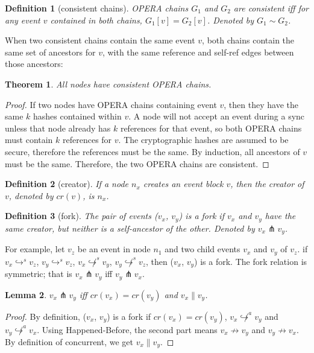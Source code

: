\documentclass{article}
\newtheorem{thm}{Theorem}[section]
\newtheorem{lem}[thm]{Lemma}
\newtheorem{defn}{Definition}[section]
\newcommand{\eself}{\hookrightarrow^{s}}
\newcommand{\eancestor}{\hookrightarrow^{a}}
\newcommand{\efork}{\pitchfork}
\newcommand{\concur}{\parallel}
\begin{document}
\begin{defn}[consistent chains]\label{dfn:conchains} OPERA chains $G_1$ and $G_2$ are consistent iff for any event $v$ contained in both chains, $G_1[v] = G_2[v]$. Denoted by $G_1 \sim G_2$.
\end{defn}
When two consistent chains contain the same event $v$, both chains contain the same set of ancestors for $v$, with the same reference and self-ref edges between those ancestors:
\begin{thm}\label{thm:conchains}
	All nodes have consistent OPERA chains.
\end{thm}
\begin{proof}
	 If two nodes have OPERA chains containing event $v$, then they have the same $k$ hashes contained within $v$. A node will not accept an event during a sync unless that node already has $k$ references for that event, so both OPERA chains must contain $k$ references for $v$. The cryptographic hashes are assumed to be secure, therefore the references must be the same. By induction, all ancestors of $v$ must be the same. Therefore, the two OPERA chains are consistent.
\end{proof}


\begin{defn}[creator] If a node $n_x$ creates an event block $v$, then the creator of $v$, denoted by $cr(v)$, is $n_x$.
\end{defn}


\begin{defn}[fork]
	The pair of events ($v_x$, $v_y$) is a fork if $v_x$ and $v_y$ have the same creator, but neither is a self-ancestor of the other. Denoted by $v_x \efork v_y$.
\end{defn}
For example, let $v_z$ be an event in node $n_1$ and two child events $v_x$ and $v_y$ of $v_z$. if $v_x \eself v_z$, $v_y \eself v_z$, $v_x \not \eself v_y$, $v_y \not \eself v_z$, then ($v_x$, $v_y$) is a fork.
The fork relation is symmetric; that is $v_x \efork v_y$ iff $v_y \efork v_x$.
\begin{lem}
	$v_x \efork v_y$ iff $cr(v_x)=cr(v_y)$ and $v_x \concur v_y$.
\end{lem}
\begin{proof}
By definition, ($v_x$, $v_y$) is a fork if $cr(v_x)=cr(v_y)$, $v_x \not \eancestor v_y$ and $v_y \not \eancestor v_x$. Using Happened-Before, the second part means $v_x \not \rightarrow v_y$ and $v_y \not \rightarrow v_x$. By definition of concurrent, we get $v_x \concur v_y$.
\end{proof}
\end{document}
